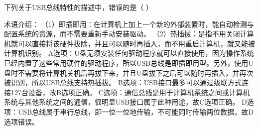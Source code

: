 \question 下列关于USB总线特性的描述中，错误的是（ ）
\par{}
\begin{solution}术语介绍：
（1）即插即用：在计算机上加上一个新的外部装置时，能自动检测与配置系统的资源，而不需要重新手动安装驱动。
（2）热插拔：是指不用关闭计算机就可以直接将该硬件拔除，并且可以随时再插入，而不用重启计算机，就又能被计算机识别。
A选项：U盘无须安装任何驱动程序就可以直接使用，因为操作系统已经内置了这些常用硬件的驱动程序，所以USB总线是即插即用型。另外，使用U盘时不需要将计算机关机后再拔下来，并且U盘拔下之后可以随时再插入，并再次被识别，所以USB总线支持热插拔。
B选项：USB接口最多可以通过级联方式连接127台设备，故B选项正确。
C选项：通信总线是用于计算机系统之间或计算机系统与其他系统之间的通信，很明显USB接口属于此种用途，故C选项正确。
D选项：USB总线属于串行总线，即一位一位地传输，不可能同时传输两位数据，故D选项错误。
\end{solution}
